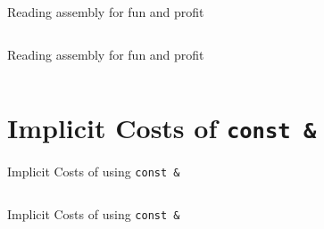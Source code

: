 \begin{frame}[fragile]{Reading assembly for fun and profit}
    \begin{columns}[t]
        \begin{column}{.45\textwidth}

        \end{column}
        \begin{column}{.45\textwidth}
        \end{column}
    \end{columns}

\end{frame}

\begin{frame}[fragile]{Reading assembly for fun and profit}
    \begin{columns}[t]
        \begin{column}{.45\textwidth}
        \end{column}
        \begin{column}{.45\textwidth}
        \end{column}
    \end{columns}
\end{frame}


\section{Implicit Costs of \texttt{const \&}}

\begin{frame}[fragile]{Implicit Costs of using \texttt{const \&}}
    \begin{columns}[t]
        \begin{column}{.45\textwidth}
        \end{column}
        \begin{column}{.45\textwidth}
        \end{column}
    \end{columns}
\end{frame}

\begin{frame}[fragile]{Implicit Costs of using \texttt{const \&}}
    \begin{columns}[t]
        \begin{column}{.45\textwidth}
        \end{column}
        \begin{column}{.45\textwidth}
        \end{column}
    \end{columns}
\end{frame}


